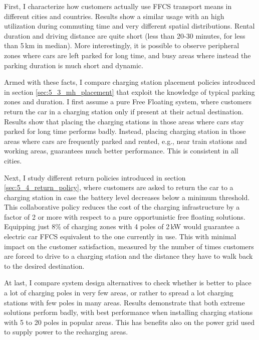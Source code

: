 First, I characterize how customers actually use FFCS transport means in different cities and countries. Results show a similar usage with an high utilization during commuting time and very different spatial distributions. Rental duration and driving distance are quite short (less than 20-30 minutes, for less than 5\,km in median). More interestingly, it is possible to observe peripheral zones where cars are left parked for long time, and busy areas where instead the parking duration is much short and dynamic.

Armed with these facts, I compare charging station placement policies introduced in section \ref{sec:5_3_mh_placement} that exploit the knowledge of typical parking zones and duration. I first assume a pure Free Floating system, where customers return the car in a charging station only if present at their actual destination.
Results show that placing the charging stations in those areas where cars stay parked for long time performs badly. Instead, placing charging station in those areas where cars are frequently parked and rented, e.g., near train stations and working areas, guarantees much better performance. This is consistent in all cities.

Next, I study different return policies introduced in section \ref{sec:5_4_return_policy}, where customers are asked to return the car to a charging station in case the battery level decreases below a minimum threshold. This collaborative policy reduces the cost of the charging infrastructure by a factor of 2 or more with respect to a pure opportunistic free floating solutions. Equipping just 8\% of charging zones with 4 poles of 2\,kW would guarantee a electric car FFCS equivalent to the one currently in use.
This with minimal impact on the customer satisfaction, measured by the number of times customers are forced to drive to a charging station and the distance they have to walk back to the desired destination.

At last, I compare system design alternatives to check whether is better to place a lot of charging poles in very few areas, or rather to spread a lot charging stations with few poles in many areas. Results demonstrate that both extreme solutions perform badly, with best performance when installing charging stations with  5 to 20 poles in popular areas. This has benefits also on the power grid used to supply power to the recharging areas.


